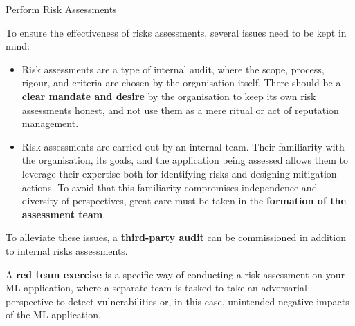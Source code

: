 \begin{frame}[plain]{ Perform Risk Assessments
 }
\begin{itemize}
\end{itemize}


To ensure the effectiveness of risks assessments, several issues need to be kept in mind:


\begin{itemize}

  \item Risk assessments are a type of internal audit, where the scope, process, rigour, and criteria are chosen by the organisation itself. There should be a \textbf{clear mandate and desire} by the organisation to keep its own risk assessments honest, and not use them as a mere ritual or act of reputation management.

  \item Risk assessments are carried out by an internal team. Their familiarity with the organisation, its goals, and the application being assessed allows them to leverage their expertise both for identifying risks and designing mitigation actions. To avoid that this familiarity compromises independence and diversity of perspectives, great care must be taken in the \textbf{formation of the assessment team}.

\end{itemize}


To alleviate these issues, a \textbf{third-party audit} can be commissioned in addition to internal risks assessments.


A \textbf{red team exercise} is a specific way of conducting a risk assessment on your ML application, where a separate team is tasked to take an adversarial perspective to detect vulnerabilities or, in this case, unintended negative impacts of the ML application.


 


  \end{frame}

